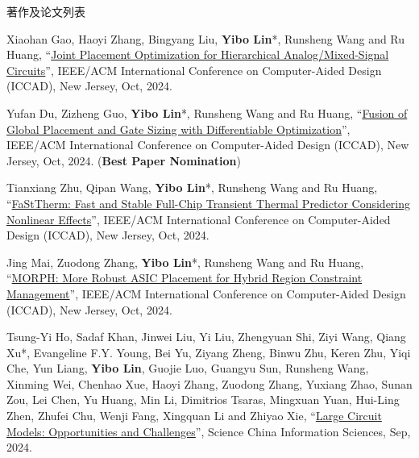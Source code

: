 \begin{rSection}{著作及论文列表}
\begin{description}[font=\normalfont, rightmargin=2em]
\item[{[C161]}]{
        Xiaohan Gao, Haoyi Zhang, Bingyang Liu, \textbf{Yibo Lin}*, Runsheng Wang and Ru Huang, 
    ``\href{https://doi.org/10.1145/3676536.3676664}{Joint Placement Optimization for Hierarchical Analog/Mixed-Signal Circuits}'', 
    IEEE/ACM International Conference on Computer-Aided Design (ICCAD), New Jersey, Oct, 2024.
    
}
            

\item[{[C160]}]{
        Yufan Du, Zizheng Guo, \textbf{Yibo Lin}*, Runsheng Wang and Ru Huang, 
    ``\href{https://doi.org/10.1145/3676536.3676670}{Fusion of Global Placement and Gate Sizing with Differentiable Optimization}'', 
    IEEE/ACM International Conference on Computer-Aided Design (ICCAD), New Jersey, Oct, 2024.
    (\textbf{Best Paper Nomination})
}
            

\item[{[C159]}]{
        Tianxiang Zhu, Qipan Wang, \textbf{Yibo Lin}*, Runsheng Wang and Ru Huang, 
    ``\href{https://doi.org/10.1145/3676536.3676738}{FaStTherm: Fast and Stable Full-Chip Transient Thermal Predictor Considering Nonlinear Effects}'', 
    IEEE/ACM International Conference on Computer-Aided Design (ICCAD), New Jersey, Oct, 2024.
    
}
            

\item[{[C158]}]{
        Jing Mai, Zuodong Zhang, \textbf{Yibo Lin}*, Runsheng Wang and Ru Huang, 
    ``\href{https://doi.org/10.1145/3676536.3676745}{MORPH: More Robust ASIC Placement for Hybrid Region Constraint Management}'', 
    IEEE/ACM International Conference on Computer-Aided Design (ICCAD), New Jersey, Oct, 2024.
    
}
            

\item[{[J157]}]{
        Tsung-Yi Ho, Sadaf Khan, Jinwei Liu, Yi Liu, Zhengyuan Shi, Ziyi Wang, Qiang Xu*, Evangeline F.Y. Young, Bei Yu, Ziyang Zheng, Binwu Zhu, Keren Zhu, Yiqi Che, Yun Liang, \textbf{Yibo Lin}, Guojie Luo, Guangyu Sun, Runsheng Wang, Xinming Wei, Chenhao Xue, Haoyi Zhang, Zuodong Zhang, Yuxiang Zhao, Sunan Zou, Lei Chen, Yu Huang, Min Li, Dimitrios Tsaras, Mingxuan Yuan, Hui-Ling Zhen, Zhufei Chu, Wenji Fang, Xingquan Li and Zhiyao Xie, 
    ``\href{https://doi.org/10.1007/s11432-024-4155-7}{Large Circuit Models: Opportunities and Challenges}'', 
    Science China Information Sciences, Sep, 2024.
    
}
\end{description}
\end{rSection}
